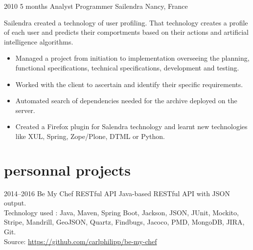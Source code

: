 \documentclass[]{friggeri-cv} %
\begin{document}

\begin{entrylist}

\entry
{2010}
{5 months}
{Analyst Programmer} 
{Sailendra}
{Nancy, France}
{Sailendra created a technology of user profiling. That technology creates a profile of each user and predicts their comportments based on their actions and artificial intelligence algorithms.\\

\vspace{-4mm}
\begin{itemize}
	\item Managed a project from initiation to implementation overseeing the planning, functional specifications, technical specifications, development and testing.
	\item Worked with the client to ascertain and identify their specific requirements.
	\item Automated search of dependencies needed for the archive deployed on the server.
   \item Created a Firefox plugin for Salendra technology and learnt new technologies like XUL, Spring, Zope/Plone, DTML or Python.
\end{itemize}}
\vspace{-7mm}

\end{entrylist}

\clearpage


\section{personnal projects}

\begin{entrylist}

\entry
{2014--2016}
{}
{Be My Chef}
{  RESTful API}
{}
{Java-based RESTful API with JSON output.\\
Technology used : Java, Maven, Spring Boot, Jackson, JSON, JUnit, Mockito, Stripe, Mandrill, GeoJSON, Quartz, Findbugs, Jacoco, PMD, MongoDB, JIRA, Git.\\
\footnotesize{Source: \href{https://github.com/carlphilipp/be-my-chef}{https://github.com/carlphilipp/be-my-chef}}
}

\end{entrylist}
\end{document}
